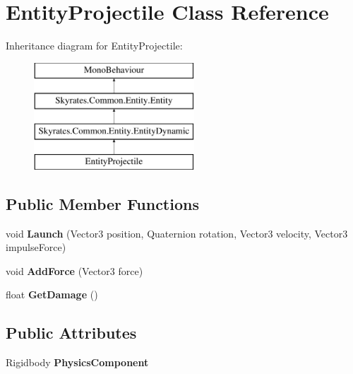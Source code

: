 \hypertarget{class_entity_projectile}{\section{Entity\-Projectile Class Reference}
\label{class_entity_projectile}
}
Inheritance diagram for Entity\-Projectile\-:\begin{figure}[H]
\begin{center}
\leavevmode
\includegraphics[height=4.000000cm]{class_entity_projectile}
\end{center}
\end{figure}
\subsection*{Public Member Functions}
\begin{DoxyCompactItemize}
\item 
\hypertarget{class_entity_projectile_ada869ac9caf8c4da53c53ac50d04cef5}{void {\bfseries Launch} (Vector3 position, Quaternion rotation, Vector3 velocity, Vector3 impulse\-Force)}\label{class_entity_projectile_ada869ac9caf8c4da53c53ac50d04cef5}

\item 
\hypertarget{class_entity_projectile_a028b344e40b3db9dd418110412dd81b7}{void {\bfseries Add\-Force} (Vector3 force)}\label{class_entity_projectile_a028b344e40b3db9dd418110412dd81b7}

\item 
\hypertarget{class_entity_projectile_ab800c5f6f125d81a48b7220629414a68}{float {\bfseries Get\-Damage} ()}\label{class_entity_projectile_ab800c5f6f125d81a48b7220629414a68}

\end{DoxyCompactItemize}
\subsection*{Public Attributes}
\begin{DoxyCompactItemize}
\item 
\hypertarget{class_entity_projectile_af5d50c3e4c16e3106fedd51f99e21d9a}{Rigidbody {\bfseries Physics\-Component}}\label{class_entity_projectile_af5d50c3e4c16e3106fedd51f99e21d9a}

\end{DoxyCompactItemize}
